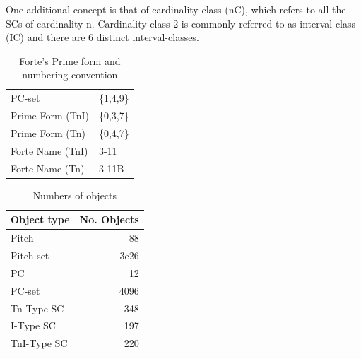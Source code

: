 \documentclass{article}
\begin{document}
One additional concept is that of cardinality-class (nC), which refers
to all the SCs of cardinality n. Cardinality-class 2 is commonly
referred to as interval-class (IC) and there are 6 distinct
interval-classes.
\begin{table}[htb]
\caption{Forte's Prime form and numbering convention} 
\begin{center}
\begin{tabular}{ll}
 PC-set            &  \{1,4,9\}  \\
 Prime Form (TnI)  &  \{0,3,7\}  \\
 Prime Form (Tn)   &  \{0,4,7\}  \\
 Forte Name (TnI)  &  3-11       \\
 Forte Name (Tn)   &  3-11B      \\
\end{tabular}
\end{center}
\end{table}


\begin{table}[htb]
\caption{Numbers of objects} 
\begin{center}
\begin{tabular}{lr}
 Object type  &  No. Objects  \\
\hline
 Pitch        &           88  \\
 Pitch set    &         3e26  \\
 PC           &           12  \\
 PC-set       &         4096  \\
 Tn-Type SC   &          348  \\
 I-Type SC    &          197  \\
 TnI-Type SC  &          220  \\
\end{tabular}
\end{center}
\end{table}
\end{document}
